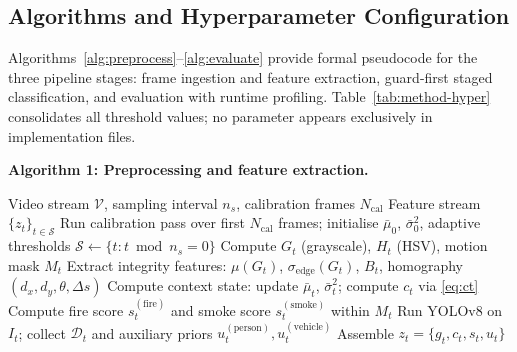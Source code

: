 \documentclass[a4paper,fleqn]{cas-dc}
\begin{document}
\FloatBarrier
\subsection{Algorithms and Hyperparameter Configuration}
 
Algorithms~\ref{alg:preprocess}--\ref{alg:evaluate} provide formal pseudocode for the three pipeline stages: frame ingestion and feature extraction, guard-first staged classification, and evaluation with runtime profiling. Table~\ref{tab:method-hyper} consolidates all threshold values; no parameter appears exclusively in implementation files.
 
\noindent\textbf{Algorithm 1: Preprocessing and feature extraction.}
\begin{algorithm}[H]
\caption{Preprocessing and Feature Extraction}
\label{alg:preprocess}
\begin{algorithmic}[1]
\Require Video stream $\mathcal{V}$, sampling interval $n_s$, calibration frames $N_{\text{cal}}$
\Ensure Feature stream $\{z_t\}_{t \in \mathcal{S}}$
\State Run calibration pass over first $N_{\text{cal}}$ frames; initialise $\bar{\mu}_0$, $\bar{\sigma}_0^2$, adaptive thresholds
\State $\mathcal{S} \leftarrow \{t : t \bmod n_s = 0\}$
    \State Compute $G_t$ (grayscale), $H_t$ (HSV), motion mask $M_t$
    \State Extract integrity features: $\mu(G_t)$, $\sigma_{\text{edge}}(G_t)$, $B_t$, homography $(d_x,d_y,\theta,\Delta s)$
    \State Compute context state: update $\bar{\mu}_t$, $\bar{\sigma}_t^2$; compute $c_t$ via \eqref{eq:ct}
    \State Compute fire score $s_t^{(\text{fire})}$ and smoke score $s_t^{(\text{smoke})}$ within $M_t$
    \State Run YOLOv8 on $I_t$; collect $\mathcal{D}_t$ and auxiliary priors $u_t^{(\text{person})}, u_t^{(\text{vehicle})}$
    \State Assemble $z_t = \{g_t, c_t, s_t, u_t\}$
\EndFor
\end{algorithmic}
\end{algorithm}
 
\end{document}
